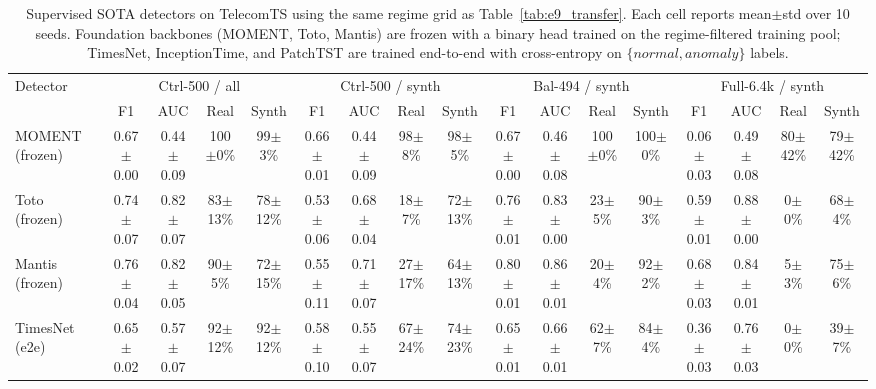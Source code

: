 \begin{table}[t]
  \caption{Supervised SOTA detectors on TelecomTS using the same regime grid as Table~\ref{tab:e9_transfer}. Each cell reports mean$\pm$std over 10 seeds. Foundation backbones (MOMENT, Toto, Mantis) are frozen with a binary head trained on the regime-filtered training pool; TimesNet, InceptionTime, and PatchTST are trained end-to-end with cross-entropy on $\{normal, anomaly\}$ labels.}
  \label{tab:e14_sup}
  \footnotesize
  \setlength{\tabcolsep}{1.5pt}
  \begin{tabular*}{\textwidth}{@{\extracolsep{\fill}}lcccccccccccccccc@{}}
    \toprule
    Detector & \multicolumn{4}{c}{Ctrl-500 / all} & \multicolumn{4}{c}{Ctrl-500 / synth} & \multicolumn{4}{c}{Bal-494 / synth} & \multicolumn{4}{c}{Full-6.4k / synth} \\
    \cmidrule(lr){2-5}\cmidrule(lr){6-9}\cmidrule(lr){10-13}\cmidrule(lr){14-17}
      & F1 & AUC & Real & Synth & F1 & AUC & Real & Synth & F1 & AUC & Real & Synth & F1 & AUC & Real & Synth \\
    \midrule
    MOMENT~\cite{goswami2024moment} (frozen) & 0.67{\tiny$\pm$0.00} & 0.44{\tiny$\pm$0.09} & 100{\tiny$\pm$0}\% & 99{\tiny$\pm$3}\% & 0.66{\tiny$\pm$0.01} & 0.44{\tiny$\pm$0.09} & 98{\tiny$\pm$8}\% & 98{\tiny$\pm$5}\% & 0.67{\tiny$\pm$0.00} & 0.46{\tiny$\pm$0.08} & 100{\tiny$\pm$0}\% & 100{\tiny$\pm$0}\% & 0.06{\tiny$\pm$0.03} & 0.49{\tiny$\pm$0.08} & 80{\tiny$\pm$42}\% & 79{\tiny$\pm$42}\% \\
    Toto~\cite{toto2024} (frozen) & 0.74{\tiny$\pm$0.07} & 0.82{\tiny$\pm$0.07} & 83{\tiny$\pm$13}\% & 78{\tiny$\pm$12}\% & 0.53{\tiny$\pm$0.06} & 0.68{\tiny$\pm$0.04} & 18{\tiny$\pm$7}\% & 72{\tiny$\pm$13}\% & 0.76{\tiny$\pm$0.01} & 0.83{\tiny$\pm$0.00} & 23{\tiny$\pm$5}\% & 90{\tiny$\pm$3}\% & 0.59{\tiny$\pm$0.01} & 0.88{\tiny$\pm$0.00} & 0{\tiny$\pm$0}\% & 68{\tiny$\pm$4}\% \\
    Mantis~\cite{feofanov2025mantis} (frozen) & 0.76{\tiny$\pm$0.04} & 0.82{\tiny$\pm$0.05} & 90{\tiny$\pm$5}\% & 72{\tiny$\pm$15}\% & 0.55{\tiny$\pm$0.11} & 0.71{\tiny$\pm$0.07} & 27{\tiny$\pm$17}\% & 64{\tiny$\pm$13}\% & 0.80{\tiny$\pm$0.01} & 0.86{\tiny$\pm$0.01} & 20{\tiny$\pm$4}\% & 92{\tiny$\pm$2}\% & 0.68{\tiny$\pm$0.03} & 0.84{\tiny$\pm$0.01} & 5{\tiny$\pm$3}\% & 75{\tiny$\pm$6}\% \\
    TimesNet~\cite{wu2023timesnet} (e2e) & 0.65{\tiny$\pm$0.02} & 0.57{\tiny$\pm$0.07} & 92{\tiny$\pm$12}\% & 92{\tiny$\pm$12}\% & 0.58{\tiny$\pm$0.10} & 0.55{\tiny$\pm$0.07} & 67{\tiny$\pm$24}\% & 74{\tiny$\pm$23}\% & 0.65{\tiny$\pm$0.01} & 0.66{\tiny$\pm$0.01} & 62{\tiny$\pm$7}\% & 84{\tiny$\pm$4}\% & 0.36{\tiny$\pm$0.03} & 0.76{\tiny$\pm$0.03} & 0{\tiny$\pm$0}\% & 39{\tiny$\pm$7}\% \\

\end{tabular*}
\end{table}
